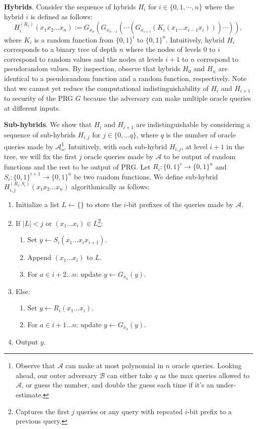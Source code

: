 \documentclass[12pt]{tufte-book}
\begin{document}
\noindent \textbf{Hybrids}. Consider the sequence of hybrids $H_i$ for $i \in \{ 0, 1, \cdots, n\}$ where the hybrid $i$ is defined as follows:
\[H_{i}^{(K_i)} (x_1x_2\ldots x_n ):= G_{x_n}(G_{x_{n-1}} (\cdots(G_{x_{i+1}}(K_i(x_1\dots x_{i-1}x_i))) \cdots  )), \]
where $K_i$ is a random function from $\{0,1\}^{i}$ to $\{0,1\}^n$. Intuitively, hybrid $H_i$ corresponds to a binary tree of depth $n$ where the nodes of levels $0$ to $i$ correspond to random values and the nodes at levels $i+1$ to $n$ correspond to pseudorandom values. By inspection, observe that hybrids $H_0$ and $H_n$ are identical to a pseudorandom function and a random function, respectively. Note that we cannot yet reduce the computational indistinguishability of $H_i$ and $H_{i+1}$ to security of the PRG $G$ because the adversary can make multiple oracle queries at different inputs.\smallskip

\noindent \textbf{Sub-hybrids}. We show that $H_{i}$ and $H_{i+1}$ are indistinguishable by considering a sequence of sub-hybrids $H_{i,j}$ for $j \in \{0,\ldots q\}$, where $q$ is the number of oracle queries made by $\mathcal{A}$\footnote{Observe that $\mathcal{A}$ can make at most polynomial in $n$ oracle queries. Looking ahead, our outer adversary $\mathcal{B}$ can either take $q$ as the max queries allowed to $\mathcal{A}$, or guess the number, and double the guess each time if it's an under-estimate.}.
Intuitively, with each sub-hybrid $H_{i,j}$, at level $i+1$ in the tree, we will fix the first $j$ oracle queries made by $\mathcal{A}$ to be output of random functions and the rest to be output of PRG. Let $R_i: \{0, 1\}^i \to \{0, 1\}^n$ and $S_{i}: \{0, 1\}^{i+1} \to \{0, 1\}^n$ be two random functions.
We define sub-hybrid $H_{i,j}^{(R_i, S_{i})}(x_1x_2\dots x_n)$ algorithmically as follows:
\begin{enumerate}
    \item Initialize a list $L \gets \{\}$ to store the $i$-bit prefixes of the queries made by $\mathcal{A}$.
    \item If $|L| < j$ or $(x_1\dots x_i) \in L$\footnote{Captures the first $j$ queries or any query with repeated $i$-bit prefix to a previous query.}:
          \begin{enumerate}
              \item Set $y \gets S_i(x_1\dots x_i x_{i+1})$.
              \item Append $(x_1\dots x_i)$ to $L$.
              \item For $a \in i+2 \dots n$: update $y \gets G_{x_a}(y)$.
          \end{enumerate}
    \item Else:
          \begin{enumerate}
              \item Set $y \gets R_i(x_1\dots x_i)$.
              \item For $a \in i+1 \dots n$: update $y \gets G_{x_a}(y)$.
          \end{enumerate}
    \item Output $y$.
\end{enumerate}
\end{document}
